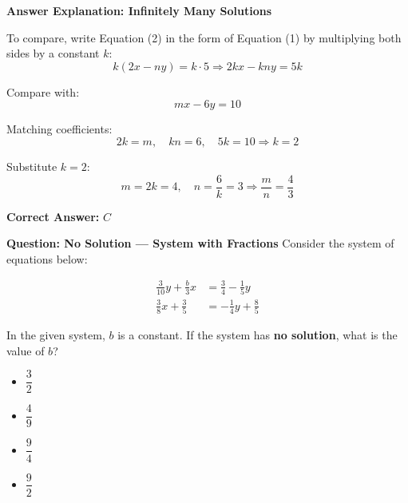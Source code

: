 \documentclass{beamer}
\begin{document}
\begin{frame}{\textbf{Answer Explanation: Infinitely Many Solutions}}
\small


To compare, write Equation (2) in the form of Equation (1) by multiplying both sides by a constant \( k \):
\[
k(2x - ny) = k \cdot 5 \Rightarrow 2k x - kn y = 5k
\]

Compare with:
\[
mx - 6y = 10
\]

Matching coefficients:
\[
2k = m, \quad kn = 6, \quad 5k = 10 \Rightarrow k = 2
\]

Substitute \( k = 2 \):
\[
m = 2k = 4, \quad n = \frac{6}{k} = 3 \Rightarrow \frac{m}{n} = \frac{4}{3}
\]

\textbf{Correct Answer:} \( \boxed{C} \)
\end{frame}


\begin{frame}{\textbf{Question: No Solution — System with Fractions}}
Consider the system of equations below:

\[
\begin{aligned}
\frac{3}{10}y + \frac{b}{3}x &= \frac{3}{4} - \frac{1}{5}y \\
\frac{3}{8}x + \frac{3}{5} &= -\frac{1}{4}y + \frac{8}{5}
\end{aligned}
\]

In the given system, \( b \) is a constant.  
If the system has \textbf{no solution}, what is the value of \( b \)?

\begin{itemize}
    \item[\textbf{A.}] \( \dfrac{3}{2} \)
    \item[\textbf{B.}] \( \dfrac{4}{9} \)
    \item[\textbf{C.}] \( \dfrac{9}{4} \)
    \item[\textbf{D.}] \( \dfrac{9}{2} \)
\end{itemize}
\end{frame}
\end{document}
